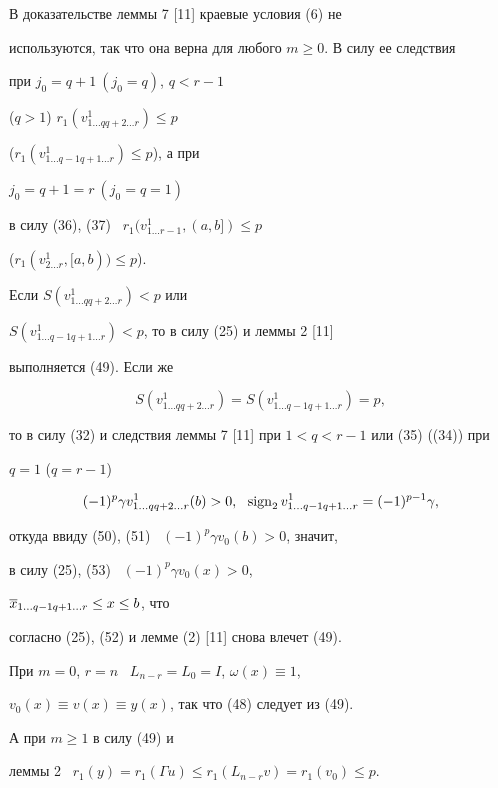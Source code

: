 \begin{pf}
В доказательстве леммы 7 [11] краевые условия (6) не


используются, так что она верна для любого $m\ge 0$. В силу ее следствия


при $j_0=q+1 \ (j_0=q)$, $q<r-1$


($q>1$) $r_1(v^1_{1\dotsc q q+2\dotsc r})\le p$


($r_1(v^1_{1\dotsc q-1 q+1\dotsc r})\le p$), а при


$j_0=q+1=r \ (j_0=q=1)$


в силу (36), (37) \ $r_1(v^1_{1\dotsc r-1},(a,b])\le p$ 


($r_1(v^1_{2\dotsc r}, [a,b))\le p$).





Если $S(v^1_{1\dotsc q q+2\dotsc r})<p$ или


$S(v^1_{1\dotsc q-1 q+1\dotsc r})<p$, то в силу (25) и леммы 2 [11]


выполняется (49). Если же 


\begin{equation}


S(v^1_{1\dotsc q q+2\dotsc r})=S(v^1_{1\dotsc q-1 q+1\dotsc r})=p,


\end{equation}


то в силу (32) и следствия леммы 7 [11] при $1<q<r-1$ или (35) ((34)) при


$q=1$ ($q=r-1$)


\begin{equation}


(-1)^p \gamma v^1_{1\dotsc q q+2\dotsc r}(b)>0,\ \ 


\sign_2 v^1_{1\dotsc q-1 q+1\dotsc r}=(-1)^{p-1}\gamma,


\end{equation}


откуда ввиду (50), (51) \ $(-1)^p\gamma v_0(b)>0$, значит,


в силу (25), (53) \ $(-1)^p\gamma v_0(x)>0$,


$\overline{x}_{1\dotsc q-1 q+1\dotsc r}\le x\le b$, что


согласно (25), (52) и лемме (2) [11] снова влечет (49).





При $m=0$, $r=n$ \ $L_{n-r}=L_0=I$, $\omega(x)\equiv 1$,


$v_0(x)\equiv v(x)\equiv y(x)$, так что (48) следует из (49).


А при $m\ge 1$ в силу (49) и 


леммы 2 \ $r_1(y)=r_1(\Gamma u)\le r_1(L_{n-r}v)=r_1(v_0)\le p$.


\end{pf}








